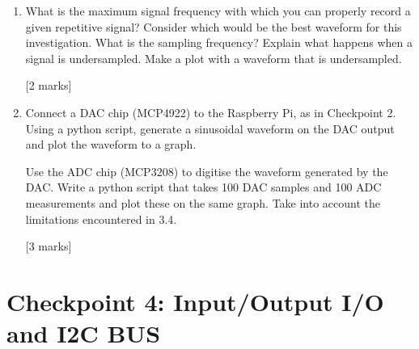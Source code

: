 \begin{enumerate}
\hfill [2 marks] \\

\item[3.4.]	What is the maximum signal frequency with which you can properly record a given repetitive signal?  Consider which would be the best waveform for this investigation. What is the sampling frequency? Explain what happens when a signal is undersampled. Make a plot with a waveform that is undersampled.   

\hfill [2 marks] \\

\item [3.5.] Connect a DAC chip (MCP4922) to the Raspberry Pi, as in Checkpoint 2.  Using a python script, generate a sinusoidal waveform on the DAC output and plot the waveform to a graph.

Use the ADC chip (MCP3208) to digitise the waveform generated by the DAC. Write a python script that takes 100 DAC samples and 100 ADC measurements and plot these on the same graph. Take into account the limitations encountered in 3.4.                                                          
 
\hfill [3 marks] 

\end{enumerate}


\newpage
\section{Checkpoint 4: Input/Output I/O and I2C BUS}

